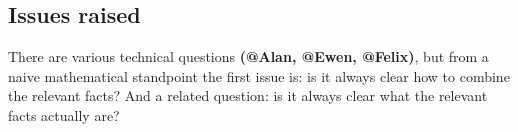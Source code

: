 \subsection{Issues raised}

There are various technical questions \textbf{(@Alan, @Ewen, @Felix)},
but from a naive mathematical standpoint the first issue is: is it
always clear how to combine the relevant facts?  And a related
question: is it always clear what the relevant facts actually are?


